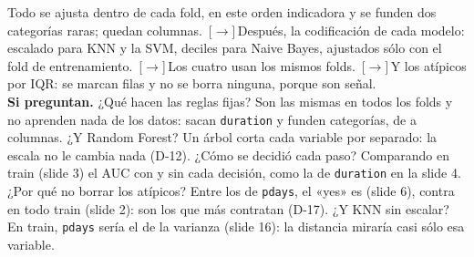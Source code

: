 \documentclass[aspectratio=169,11pt]{beamer}
\newcommand{\avanza}{\textcolor{naranja}{\,[$\rightarrow$]\,}}
\begin{document}
\begin{frame}{Todo se ajusta dentro de cada fold, en este orden}
{    indicadora y se funden dos categorías raras; quedan \columnasFinales{} columnas.
    \avanza Después, la codificación de cada modelo: escalado para KNN y la SVM, deciles para
    Naive Bayes, ajustados sólo con el fold de entrenamiento.
    \avanza Los cuatro usan los mismos folds.
    \avanza Y los atípicos por IQR: se marcan \filasAtipicasIqr{} filas y no se borra ninguna,
    porque son señal.\\[0.4em]
    \textbf{Si preguntan.} ¿Qué hacen las reglas fijas? Son las mismas en todos los folds y no
    aprenden nada de los datos: sacan \texttt{duration} y funden categorías, de
    \columnasReferencia{} a \columnasFinales{} columnas. ¿Y Random Forest? Un árbol corta cada
    variable por separado: la escala no le cambia nada (D-12). ¿Cómo se decidió cada paso? Comparando
    en train (slide 3) el AUC con y sin cada decisión, como la de \texttt{duration} en la
    slide 4. ¿Por qué no borrar los atípicos? Entre los de
    \texttt{pdays}, el «yes» es \pctYesAtipicosPdays{} (slide 6), contra \pctYesTrain{} en todo
    train (slide 2): son los que más contratan (D-17). ¿Y KNN sin escalar? En train, \texttt{pdays}
    sería el \pctVarianzaPdays{} de la varianza (slide 16): la distancia miraría casi sólo esa
    variable.}
\end{frame}

\end{document}
